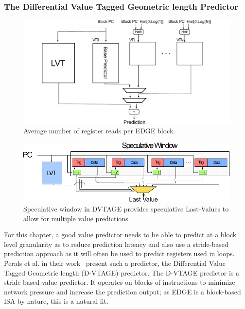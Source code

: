 \subsubsection{The Differential Value Tagged Geometric length Predictor}
\begin{figure}[t]
    \centering
    \includegraphics[width=1\textwidth]{chapter3/graphics/basic_valpred.pdf}

    \caption{Average number of register reads per EDGE block.}
    \label{fig:edge_reg_read}
	\vspace{-1em}
\end{figure}

\begin{figure}[t]
    \centering
    \includegraphics[width=1\textwidth]{chapter3/graphics/specwindow.pdf}
    \caption{Speculative window in DVTAGE provides speculative Last-Values to allow for multiple value predictions.}
    \label{fig:edge_reg_read}
	\vspace{1em}
\end{figure}

For this chapter, a good value predictor needs to be able to predict at a block level granularity as to reduce prediction latency and also use a stride-based prediction approach as it will often be used to predict registers used in loops.
Perals et al. in their work~\cite{peraisBeBop2015} present such a predictor, the Differential Value Tagged Geometric length (D-VTAGE) predictor.
The D-VTAGE predictor is a stride based value predictor.
It operates on blocks of instructions to minimize network pressure and increase the prediction output; as EDGE is a block-based ISA by nature, this is a natural fit.

